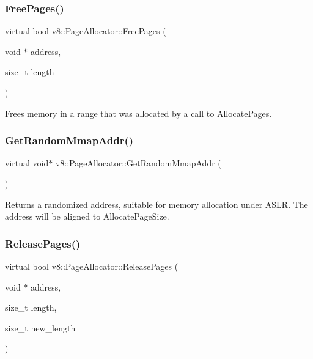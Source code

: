 \subsubsection{\texorpdfstring{Free\+Pages()}{FreePages()}}
{\footnotesize\ttfamily virtual bool v8\+::\+Page\+Allocator\+::\+Free\+Pages (\begin{DoxyParamCaption}\item[{void $\ast$}]{address,  }\item[{size\+\_\+t}]{length }\end{DoxyParamCaption})\hspace{0.3cm}{\ttfamily [pure virtual]}}

Frees memory in a range that was allocated by a call to Allocate\+Pages. \mbox{\label{classv8_1_1PageAllocator_a37f194f9c5fdbe5105476cbd1432418c}} 
\subsubsection{\texorpdfstring{Get\+Random\+Mmap\+Addr()}{GetRandomMmapAddr()}}
{\footnotesize\ttfamily virtual void$\ast$ v8\+::\+Page\+Allocator\+::\+Get\+Random\+Mmap\+Addr (\begin{DoxyParamCaption}{ }\end{DoxyParamCaption})\hspace{0.3cm}{\ttfamily [pure virtual]}}

Returns a randomized address, suitable for memory allocation under A\+S\+LR. The address will be aligned to Allocate\+Page\+Size. \mbox{\label{classv8_1_1PageAllocator_a6eb6bd93c8880dd022a61a13c65f66c0}} 
\subsubsection{\texorpdfstring{Release\+Pages()}{ReleasePages()}}
{\footnotesize\ttfamily virtual bool v8\+::\+Page\+Allocator\+::\+Release\+Pages (\begin{DoxyParamCaption}\item[{void $\ast$}]{address,  }\item[{size\+\_\+t}]{length,  }\item[{size\+\_\+t}]{new\+\_\+length }\end{DoxyParamCaption})\hspace{0.3cm}{\ttfamily [pure virtual]}}


